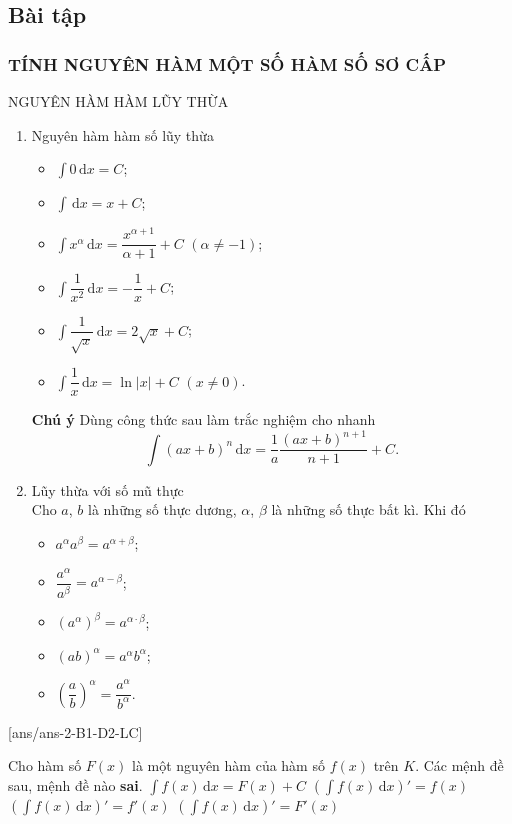 \subsection{Bài tập}
\subsubsection{TÍNH NGUYÊN HÀM MỘT SỐ HÀM SỐ SƠ CẤP}
\begin{dang}{NGUYÊN HÀM HÀM LŨY THỪA}
	\begin{enumerate}[1.]
		\item Nguyên hàm hàm số lũy thừa
		\begin{itemize}
			\item $\displaystyle\int{0\mathrm{\,d}x}=C$;
			\item $\displaystyle\int{\mathrm{\,d}x}=x+C$;
			\item $\displaystyle\int{x^\alpha\mathrm{\,d}x}=\dfrac{x^{\alpha+1}}{\alpha+1}+C$ $(\alpha\ne-1)$;
			\item $\displaystyle\int{\dfrac{1}{x^2}\mathrm{\,d}x}=-\dfrac{1}{x}+C$;
			\item $\displaystyle\int{\dfrac{1}{\sqrt{x}}\mathrm{\,d}x}=2\sqrt{x}+C$;
			\item $\displaystyle\int{\dfrac{1}{x}\mathrm{\,d}x}=\ln |x|+C$ $(x\ne0)$.
		\end{itemize}
\begin{note}\textbf{Chú ý}
	Dùng công thức sau làm trắc nghiệm cho nhanh $$\displaystyle\int(ax+b)^n\mathrm{\,d}x=\dfrac{1}{a}\dfrac{(ax+b)^{n+1}}{n+1}+C.$$
\end{note}
	
		\item Lũy thừa với số mũ thực\\
	Cho $a$, $b$ là những số thực dương, $\alpha$, $\beta$ là những số thực bất kì. Khi đó
	\begin{itemize}
		\item $a^{\alpha}a^{\beta}=a^{\alpha +\beta}$;
		\item $\dfrac{a^{\alpha}}{a^{\beta}}=a^{\alpha -\beta}$;
		\item $(a^{\alpha})^{\beta}=a^{\alpha\cdot \beta}$;
		\item $(ab)^{\alpha}=a^{\alpha}b^{\alpha}$;
		\item $\left(\dfrac{a}{b}\right)^{\alpha}=\dfrac{a^{\alpha}}{b^{\alpha}}$.
	\end{itemize}
	\end{enumerate}
\end{dang}
\TN
{}[ans/ans-2-B1-D2-LC]
\begin{ex}%
	Cho hàm số $F(x)$ là một nguyên hàm của hàm số $f(x)$ trên $K$. Các mệnh đề sau, mệnh đề nào \textbf{sai}.
	\choice
	{$\displaystyle\int{f(x)\mathrm{\,d}x=}F(x)+C$}
	{$\displaystyle{\left(\displaystyle\int{f(x)\mathrm{\,d}x}\right)'}=f(x)$}
	{\True $\displaystyle{\left(\displaystyle\int{f(x)\mathrm{\,d}x}\right)'}=f'(x)$}
	{$\displaystyle{\left(\displaystyle\int{f(x)\mathrm{\,d}x}\right)'}=F'(x)$}
\end{ex}

